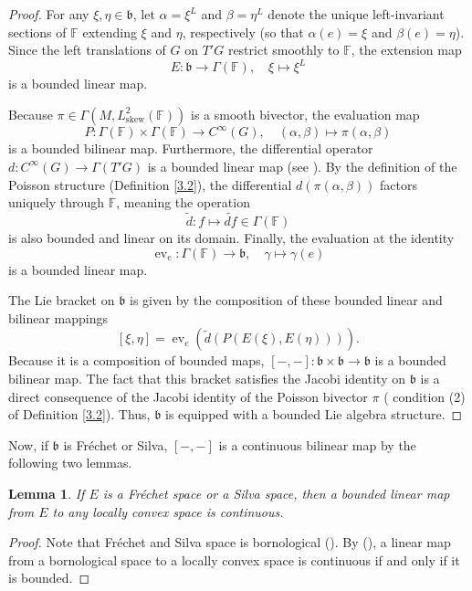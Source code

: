 \documentclass[11pt,reqno]{amsart}
\newtheorem{lemma}[theorem]{Lemma}
\theoremstyle{definition}
\numberwithin{equation}{section}
\begin{document}
\begin{proof}
For any $\xi, \eta \in \mathfrak{b}$, let $\alpha = \xi^L$ and $\beta = \eta^L$ denote the unique left-invariant sections of $\mathbb{F}$ extending $\xi$ and $\eta$, respectively (so that $\alpha(e) = \xi$ and $\beta(e) = \eta$). Since the left translations of $G$ on $T'G$ restrict smoothly to $\mathbb{F}$, the extension map 
\[
E: \mathfrak{b} \to \Gamma(\mathbb{F}), \quad \xi \mapsto \xi^L
\]
is a bounded linear map. 

Because $\pi \in \Gamma(M, L_{\text{skew}}^{2}(\mathbb{F}))$ is a smooth bivector, the evaluation map 
\[
P: \Gamma(\mathbb{F}) \times \Gamma(\mathbb{F}) \to C^\infty(G), \quad (\alpha, \beta) \mapsto \pi(\alpha, \beta)
\]
is a bounded bilinear map. Furthermore, the differential operator $d: C^\infty(G) \to \Gamma(T'G)$ is a bounded linear map (see \cite[Theorem 3.18]{20}). By the definition of the Poisson structure (Definition \ref{3.2}), the differential $d(\pi(\alpha, \beta))$ factors uniquely through $\mathbb{F}$, meaning the operation
\[
\tilde d:f \mapsto \widetilde{df} \in \Gamma(\mathbb{F})
\]
is also bounded and linear on its domain. Finally, the evaluation at the identity 
\[
\operatorname{ev}_e: \Gamma(\mathbb{F}) \to \mathfrak{b}, \quad \gamma \mapsto \gamma(e)
\]
is a bounded linear map. 

The Lie bracket on $\mathfrak{b}$ is given by the composition of these bounded linear and bilinear mappings
\[
[\xi, \eta] = \operatorname{ev}_e \left( \widetilde{d} \left( P(E(\xi), E(\eta)) \right) \right).
\]
Because it is a composition of bounded maps, $[-,-]: \mathfrak{b} \times \mathfrak{b} \to \mathfrak{b}$ is a bounded bilinear map. The fact that this bracket satisfies the Jacobi identity on $\mathfrak{b}$ is a direct consequence of the Jacobi identity of the Poisson bivector $\pi$ ( condition (2) of Definition \ref{3.2}). Thus, $\mathfrak{b}$ is equipped with a bounded Lie algebra structure.
\end{proof}

Now, if $\mathfrak{b}$ is Fréchet or Silva, $[-,-]$ is a continuous bilinear map by the following two lemmas.

\begin{lemma}
If $E$ is a Fréchet space or a Silva space, then a bounded linear map from $E$ to any locally convex space is continuous.
\end{lemma}

\begin{proof}
Note that Fréchet and Silva space is bornological (\cite[8.2, Corollary 2]{28}). By (\cite[8.3]{28}), a linear map from a bornological space to a locally convex space is continuous if and only if it is bounded.

\end{proof}
\end{document}
